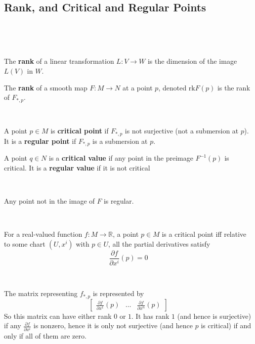 \documentclass{article}
\begin{document}
\subsection{Rank, and Critical and Regular Points}
\

\begin{definition}[Rank]
  \

  The \textbf{rank} of a linear transformation $L: V \to W$ is the dimension of the image $L(V)$ in $W$.

  The \textbf{rank} of a smooth map $F: M \to N$ at a point $p$, denoted $\text{rk} F(p)$ is the rank of $F_{*,p}$.
\end{definition}

\begin{definition}
  \

  A point $p \in M$ is \textbf{critical point} if $F_{*,p}$ is not surjective (not a submersion at $p$). It is a \textbf{regular point} if $F_{*,p}$ is a submersion at $p$.

  A point $q \in N$ is a \textbf{critical value} if any point in the preimage $F ^{-1}(p)$ is critical. It is a \textbf{regular value} if it is not critical
\end{definition}

\begin{remark}
  \

  Any point not in the image of $F$ is regular.
\end{remark}

\begin{proposition}
  \

  For a real-valued function $f: M \to \mathbb{R}$, a point $p \in M$ is a critical point iff relative to some chart $(U, x^i)$ with $p \in U$, all the partial derivatives satisfy $$\frac{\partial f}{\partial x^i}(p) = 0$$
\end{proposition}

\begin{customproof}
  \

  The matrix representing $f_{*,p}$ is represented by $$
  \begin{bmatrix}
    \frac{\partial f}{\partial x^1}(p) & \dots & \frac{\partial f}{\partial x^n}(p)
  \end{bmatrix}$$So this matrix can have either rank $0$ or $1$. It has rank $1$ (and hence is surjective) if any $\frac{\partial f}{\partial x^i}$ is nonzero, hence it is only not surjective (and hence $p$ is critical) if and only if all of them are zero.
\end{customproof}
\end{document}
